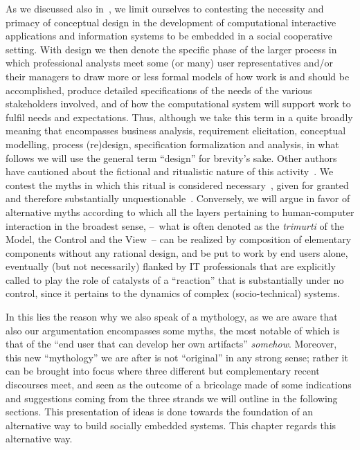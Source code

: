 \documentclass{article}
\begin{document}
As we discussed also in~\citep{cabitza_remain_2011}, we limit ourselves to contesting the necessity and primacy of conceptual design in the development of computational interactive applications and information systems to be embedded in a social cooperative setting. With design we then denote the specific phase of the larger process in which professional analysts meet some (or many) user representatives and/or their managers to draw more or less formal models of how work is and should be accomplished, produce detailed specifications of the needs of the various stakeholders involved, and of how the computational system will support work to fulfil needs and expectations. Thus, although we take this term in a quite broadly meaning that encompasses business analysis, requirement elicitation, conceptual modelling, process (re)design, specification formalization and analysis, in what follows we will use the general term ``design'' for brevity's sake. Other authors have cautioned about the fictional and ritualistic nature of this activity~\citep[e.g. ][]{robey_rituals_1984,robinson_questioning_1991,nandhakumar_fiction_1999}. We contest the myths in which this ritual is considered necessary~\citep[as also maintained within the CSCW, e.g.~][]{shipman_formality_1999}, given for granted and therefore substantially unquestionable~\citep[see also~][]{blackwell_abstract_2008}. Conversely, we will argue in favor of alternative myths according to which all the layers pertaining to human-computer interaction in the broadest sense, --~what is often denoted as the \emph{trimurti} of the Model, the Control and the View~-- can be realized by composition of elementary components without any rational design, and be put to work by end users alone, eventually (but not necessarily) flanked by IT professionals that are explicitly called to play the role of catalysts of a ``reaction'' that is substantially under no control, since it pertains to the dynamics of complex (socio-technical) systems.

In this lies the reason why we also speak of a mythology, as we are aware that also our argumentation encompasses some myths, the most notable of which is that of the ``end user that can develop her own artifacts'' \emph{somehow}. Moreover, this new ``mythology'' we are after is not ``original'' in any strong sense; rather it can be brought into focus where three different but complementary recent discourses meet, and seen as the outcome of a bricolage made of some indications and suggestions coming from the three strands we will outline in the following sections. This presentation of ideas is done towards the foundation of an alternative way to build socially embedded systems. This chapter regards this alternative way.
\end{document}
